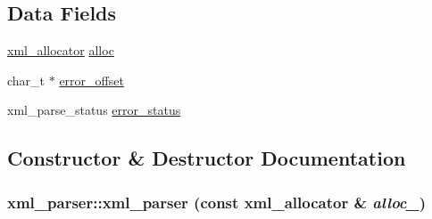 \subsection*{Data Fields}
\begin{DoxyCompactItemize}
\item 
\hyperlink{structxml__allocator}{xml\_\-allocator} \hyperlink{structxml__parser_a213cf019cbf45f5049acdcae296a2976}{alloc}
\item 
char\_\-t $\ast$ \hyperlink{structxml__parser_a2476a71cd7e67b3f4bdbcd1323524503}{error\_\-offset}
\item 
xml\_\-parse\_\-status \hyperlink{structxml__parser_a0555859911674e5a7a349447d6533383}{error\_\-status}
\end{DoxyCompactItemize}


\subsection{Constructor \& Destructor Documentation}
\hypertarget{structxml__parser_acc030c4ed339b238e1ff2d3e6fa7188b}{
\subsubsection[{xml\_\-parser}]{\setlength{\rightskip}{0pt plus 5cm}xml\_\-parser::xml\_\-parser (const {\bf xml\_\-allocator} \& {\em alloc\_\-})}}
\label{structxml__parser_acc030c4ed339b238e1ff2d3e6fa7188b}


